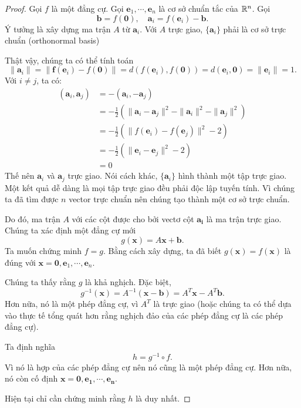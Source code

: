 \begin{proof}
  Gọi $f$ là một đẳng cự. Gọi $\mathbf{e}_1, \cdots, \mathbf{e}_n$ là cơ sở chuẩn tắc của $\mathbb{R}^n$. Gọi
  \[
    \mathbf{b} = f(\mathbf{0}), \quad \mathbf{a}_i = f(\mathbf{e}_i) - \mathbf{b}.
  \]
  Ý tưởng là xây dựng ma trận $A$ từ $\mathbf{a}_i$. Với $A$ trực giao, $\{\mathbf{a}_i\}$ phải là cơ sở trực chuẩn (orthonormal basis)

  Thật vậy, chúng ta có thể tính toán
  \[
    \|\mathbf{a}_i\| = \|\mathbf{f}(\mathbf{e}_i) - f(\mathbf{0})\| = d(f(\mathbf{e}_i), f(\mathbf{0})) = d(\mathbf{e}_i, \mathbf{0}) = \|\mathbf{e}_i\| = 1.
  \]
  Với $i \not = j$, ta có:
  \begin{align*}
    (\mathbf{a}_i, \mathbf{a}_j) &= -(\mathbf{a}_i, -\mathbf{a}_j) \\
    &=-\frac{1}{2}(\|\mathbf{a}_i - \mathbf{a}_j\|^2 - \|\mathbf{a}_i\|^2 - \|\mathbf{a}_j\|^2)\\
    &= -\frac{1}{2}(\|f(\mathbf{e}_i) - f(\mathbf{e}_j)\|^2 - 2)\\
    &= -\frac{1}{2}(\|\mathbf{e}_i - \mathbf{e}_j\|^2 - 2)\\
    &= 0
  \end{align*}
  Thế nên $\mathbf{a}_i$ và $\mathbf{a}_j$ trực giao. Nói cách khác, $\{\mathbf{a}_i\}$ hình thành một tập trực giao. Một kết quả dễ dàng là mọi tập trực giao đều phải độc lập tuyến tính. Vì chúng ta đã tìm được $n$ vector trực chuẩn nên chúng tạo thành một cơ sở trực chuẩn.

  Do đó, ma trận $A$ với các cột được cho bởi vectơ cột $\mathbf{a_i}$ là ma trận trực giao. Chúng ta xác định một đẳng cự mới
  \[
    g(\mathbf{x}) = A\mathbf{x} + \mathbf{b}.
  \]
  Ta muốn chứng minh $f = g$. Bằng cách xây dựng, ta đã biết $g(\mathbf{x}) = f(\mathbf{x})$ là đúng với $\mathbf{x} = \mathbf{0}, \mathbf{e}_1, \cdots, \mathbf{e}_n$.

  Chúng ta thấy rằng $g$ là khả nghịch. Đặc biệt,
  \[
    g^{-1}(\mathbf{x}) = A^{-1}(\mathbf{x} - \mathbf{b}) = A^T \mathbf{x} - A^T\mathbf{b}.
  \]
  Hơn nữa, nó là một phép đẳng cự, vì $A^T$ là trực giao (hoặc chúng ta có thể dựa vào thực tế tổng quát hơn rằng nghịch đảo của các phép đẳng cự là các phép đẳng cự).

  Ta định nghĩa
  \[
    h = g^{-1}\circ f.
  \]
  Vì nó là hợp của các phép đẳng cự nên nó cũng là một phép đẳng cự. Hơn nữa, nó còn cố định $\mathbf{x} = \mathbf{0}, \mathbf{e_1}, \cdots, \mathbf{e_n}$.

  Hiện tại chỉ cần chứng minh rằng $h$ là duy nhất.


\end{proof}
